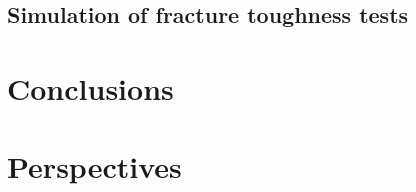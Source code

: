 \documentclass[9pt]{beamer}
\begin{document}
\subsection{Simulation of fracture toughness tests}


\section{Conclusions}


\section{Perspectives}


\section*{}
\end{document}
